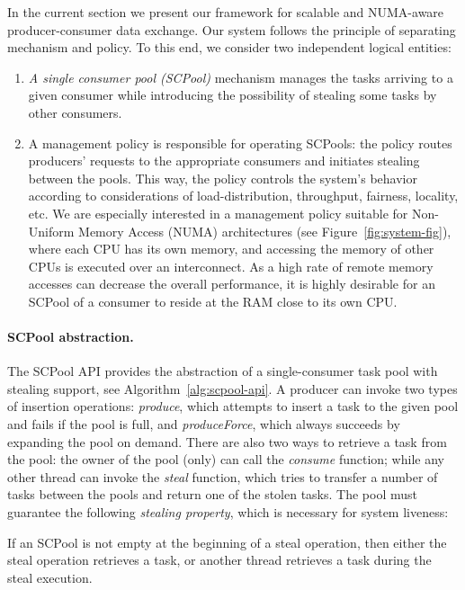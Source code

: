 In the current section we present our framework for scalable and NUMA-aware producer-consumer data exchange. 
Our system follows the principle of separating mechanism and policy.
To this end, we consider two independent logical entities: 
\begin{enumerate}
	\item \emph{A single consumer pool (SCPool)} mechanism manages the tasks arriving to a given consumer while introducing the possibility of stealing some tasks by other consumers.
	\item A management policy is responsible for operating SCPools: the policy routes producers' requests to the appropriate consumers and initiates stealing between the pools. This way, the policy controls the system's behavior according to considerations of load-distribution, throughput, fairness, locality, etc.
	We are especially interested in a management policy suitable for Non-Uniform Memory Access (NUMA) architectures (see Figure~\ref{fig:system-fig}), where each CPU has its own memory, and accessing the memory of other CPUs is executed over an interconnect. As a high rate of remote memory accesses can decrease the overall performance, it is highly desirable for an SCPool of a consumer to reside at the RAM close to its own CPU. 
\end{enumerate} 

\paragraph{SCPool abstraction.}

The SCPool API provides the abstraction of a single-consumer task pool with stealing support, see Algorithm~\ref{alg:scpool-api}.
A producer can invoke two types of insertion operations: \emph{produce}, which attempts to insert a task to the given pool and fails if the pool is full, and \emph{produceForce}, which always succeeds by expanding the pool on demand.
There are also two ways to retrieve a task from the pool: the owner of the pool (only) can call the \emph{consume} function; while any other thread can invoke the \emph{steal} function, which tries to transfer a number of tasks between the pools and return one of the stolen tasks. 
The pool must guarantee the following \emph{stealing property}, which is necessary for system liveness:
\begin{property}
If an SCPool is not empty at the beginning of a steal operation, then either the steal operation retrieves a task, or another thread retrieves a task during the steal execution.
\end{property}

